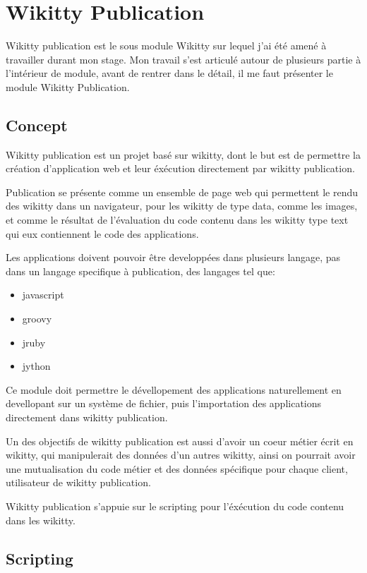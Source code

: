 \section{Wikitty Publication}

Wikitty publication est le sous module Wikitty sur lequel j'ai été amené à 
travailler durant mon stage. Mon travail s'est articulé autour de plusieurs
partie à l'intérieur de module, avant de rentrer dans le détail, il me faut 
présenter le module Wikitty Publication.

\subsection{Concept}

Wikitty publication est un projet basé sur wikitty, dont le but est de permettre
la création d'application web et leur éxécution directement par wikitty
publication. 

Publication se présente comme un ensemble de page web qui permettent le rendu 
des wikitty dans un navigateur, pour les wikitty de type data, comme les images,
et comme le résultat de l'évaluation du code contenu dans les wikitty type text
qui eux contiennent le code des applications.

Les applications doivent pouvoir être developpées dans plusieurs langage, pas 
dans un langage specifique à publication, des langages tel que:
\begin{itemize}
\item javascript
\item groovy
\item jruby
\item jython
\end{itemize}

Ce module doit permettre le dévellopement des applications naturellement 
en devellopant sur un système de fichier, puis l'importation des applications
directement dans wikitty publication.

Un des objectifs de wikitty publication est aussi d'avoir un coeur métier 
écrit en wikitty, qui manipulerait des données d'un autres wikitty, ainsi on
pourrait avoir une mutualisation du code métier et des données spécifique 
pour chaque client, utilisateur de wikitty publication.

Wikitty publication s'appuie sur le scripting pour l'éxécution du code contenu 
dans les wikitty.


\subsection{Scripting}

